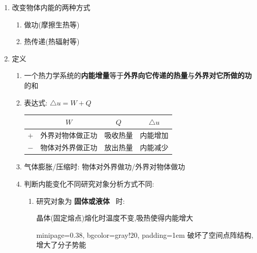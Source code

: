 \documentclass{article}
\begin{document}
\begin{enumerate}[label = \arabic*]
    \item 改变物体内能的两种方式
          \begin{enumerate}[label = (\arabic*)]
              \item 做功(摩擦生热等)
              \item 热传递(热辐射等)
          \end{enumerate}
    \item 定义
          \begin{enumerate}[label = (\arabic*)]
              \item 一个热力学系统的\textbf{内能增量}等于\textbf{外界向它传递的热量}与\textbf{外界对它所做的功}的和
              \item 表达式: $ \triangle u = W + Q $

                    \begin{center}
                        \begin{tabular}{|c|c|c|c|}
                            \hline
                            \,  & $W$      & $Q$  & $\triangle u$ \\
                            \hline
                            $+$ & 外界对物体做正功 & 吸收热量 & 内能增加          \\
                            \hline
                            $-$ & 物体对外界做正功 & 放出热量 & 内能减少          \\
                            \hline
                        \end{tabular}
                    \end{center}

              \item 气体膨胀/压缩时: 物体对外界做功/外界对物体做功
              \item 判断内能变化不同研究对象分析方式不同:
                    \begin{enumerate}[label = (\alph*)]
                        \item 研究对象为 \textbf{固体或液体} \, 时:

                              \begin{minipage}{0.8\textwidth}
                                  晶体(固定熔点)熔化时温度不变,吸热使得内能增大

                                  \vspace{-1em}
                                  \hspace{-1em}\begin{adjustbox}{minipage=0.38\linewidth, bgcolor=gray!20, padding=1em}
                                      \small
                                      破坏了空间点阵结构,增大了分子势能
                                  \end{adjustbox}
                                  \vspace{-1em}


\end{minipage}
\end{enumerate}
\end{enumerate}
\end{enumerate}
\end{document}
